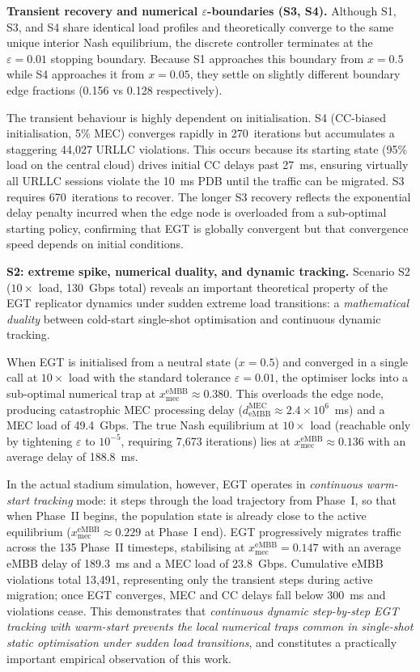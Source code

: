 \documentclass[conference]{IEEEtran}
\begin{document}
\textbf{Transient recovery and numerical $\varepsilon$-boundaries (S3, S4).}
Although S1, S3, and S4 share identical load profiles and theoretically converge to the same unique interior Nash equilibrium, the discrete controller terminates at the $\varepsilon=0.01$ stopping boundary. Because S1 approaches this boundary from $x=0.5$ while S4 approaches it from $x=0.05$, they settle on slightly different boundary edge fractions (0.156 vs 0.128 respectively).

The transient behaviour is highly dependent on initialisation. S4 (CC-biased initialisation, 5\% MEC) converges rapidly in 270~iterations but accumulates a staggering 44,027 URLLC violations. This occurs because its starting state (95\% load on the central cloud) drives initial CC delays past 27~ms, ensuring virtually all URLLC sessions violate the 10~ms PDB until the traffic can be migrated. S3 requires 670~iterations
to recover. The longer S3 recovery reflects
the exponential delay penalty incurred when the edge node is
overloaded from a sub-optimal starting policy, confirming that
EGT is globally convergent but that convergence speed depends
on initial conditions.

\textbf{S2: extreme spike, numerical duality, and dynamic tracking.}
Scenario S2 ($10\times$ load, 130~Gbps total) reveals an important
theoretical property of the EGT replicator dynamics under sudden
extreme load transitions: a \emph{mathematical duality} between
cold-start single-shot optimisation and continuous dynamic tracking.

When EGT is initialised from a neutral state ($x = 0.5$) and
converged in a single call at $10\times$ load with the standard
tolerance $\varepsilon = 0.01$, the optimiser locks into a
sub-optimal numerical trap at $x_\text{mec}^\text{eMBB} \approx 0.380$.
This overloads the edge node, producing catastrophic MEC processing
delay ($d_\text{eMBB}^\text{MEC} \approx 2.4\times10^6$~ms) and a
MEC load of 49.4~Gbps. The true Nash equilibrium at $10\times$
load (reachable only by tightening $\varepsilon$ to $10^{-5}$,
requiring 7,673 iterations) lies at
$x_\text{mec}^\text{eMBB} \approx 0.136$ with an average delay of 188.8~ms.

In the actual stadium simulation, however, EGT operates in
\emph{continuous warm-start tracking} mode: it steps through
the load trajectory from Phase~I, so that when Phase~II begins,
the population state is already close to the active equilibrium
($x_\text{mec}^\text{eMBB} \approx 0.229$ at Phase~I end). EGT
progressively migrates traffic across the 135 Phase~II timesteps,
stabilising at $x_\text{mec}^\text{eMBB} = 0.147$ with an average
eMBB delay of 189.3~ms and a MEC load of 23.8~Gbps. Cumulative
eMBB violations total 13,491, representing only the transient
steps during active migration; once EGT converges, MEC and CC
delays fall below 300~ms and violations cease. This demonstrates
that \emph{continuous dynamic step-by-step EGT tracking with warm-start prevents the local numerical traps common in single-shot
static optimisation under sudden load transitions}, and constitutes
a practically important empirical observation of this work.
\end{document}
